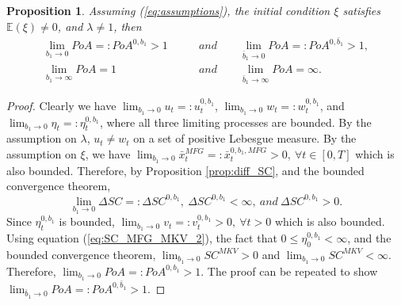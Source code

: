 \documentclass[11pt]{article}
\newtheorem{proposition}{Proposition}
\begin{document}
\begin{proposition}\label{prop:b1_b1bar}
	Assuming (\ref{eq:assumptions}), the initial condition $\xi$ satisfies $\mathbb{E}(\xi)\neq 0$, and $\lambda \neq 1$, then
	\begin{equation*}
	\begin{split}
	    \lim_{b_1 \to 0} PoA =: PoA^{0,b_1} > 1\qquad &and \qquad \lim_{\bar{b}_1 \to 0} PoA =: PoA^{0,\bar{b}_1} > 1,\\
	    \lim_{b_1 \to \infty} PoA = 1 \qquad &and \qquad\lim_{\bar{b}_1 \to \infty} PoA =\infty.
	\end{split}
	\end{equation*}
\end{proposition}
\begin{proof}
    Clearly we have $\lim_{b_1 \to 0}u_t=:u^{0,b_1}_t$, $\lim_{b_1 \to 0}w_t=:w^{0,b_1}_t$, and $\lim_{b_1 \to 0}\eta_t=:\eta^{0,b_1}_t$, where all three limiting processes are bounded. By the assumption on $\lambda$, $u_t \neq w_t$ on a set of positive Lebesgue measure. By the assumption on $\xi$, we have $\lim_{b_1 \to 0} \bar{x}^{MFG}_t=:\bar{x}^{0,b_1,MFG}_t>0,\ \forall t \in [0,T]$ which is also bounded. Therefore, by Proposition \ref{prop:diff_SC}, and the bounded convergence theorem,
    \begin{equation*}
        \lim_{b_1 \to 0} \Delta SC=:\Delta SC^{0,b_1},\  \Delta SC^{0,b_1}<\infty,\ and\ \Delta SC^{0,b_1}>0.
    \end{equation*}
    Since $\eta^{0,b_1}_t$ is bounded, $\lim_{b_1 \to 0}v_t=:v_t^{0,b_1}>0,\ \forall t>0$ which is also bounded. Using equation (\ref{eq:SC_MFG_MKV_2}), the fact that $0 \leq \eta^{0,b_1}_0 < \infty$, and the bounded convergence theorem, $\lim_{b_1 \to 0} SC^{MKV}>0$ and $\lim_{b_1 \to 0} SC^{MKV}<\infty$. Therefore, $\lim_{b_1 \to 0} PoA =: PoA^{0,b_1} > 1$. The proof can be repeated to show $\lim_{\bar{b}_1 \to 0} PoA =: PoA^{0,\bar{b}_1} > 1$.
    

\end{proof}
\end{document}
